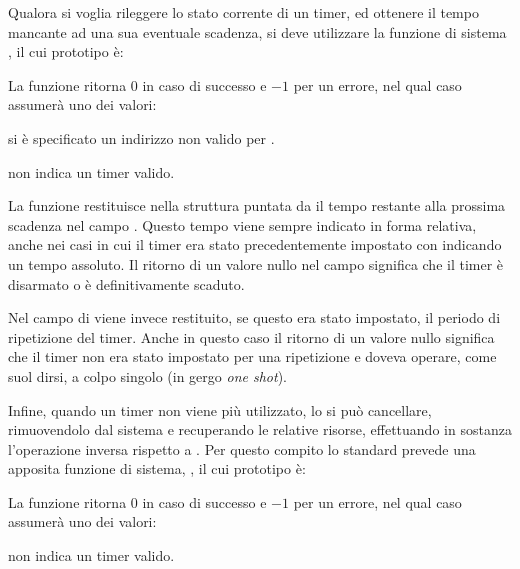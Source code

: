 Qualora si voglia rileggere lo stato corrente di un timer, ed ottenere il
tempo mancante ad una sua eventuale scadenza, si deve utilizzare la funzione
di sistema , il cui prototipo è:

\begin{funcproto}{
}

{La funzione ritorna $0$ in caso di successo e $-1$ per un errore, nel qual
  caso  assumerà uno dei valori: 
  \begin{errlist}
  \item[\errcode{EFAULT}] si è specificato un indirizzo non valido
    per .
  \item[\errcode{EINVAL}]  non indica un timer valido.
  \end{errlist}
}
\end{funcproto}

La funzione restituisce nella struttura  puntata
da  il tempo restante alla prossima scadenza nel campo
. Questo tempo viene sempre indicato in forma relativa, anche
nei casi in cui il timer era stato precedentemente impostato con
 indicando un tempo assoluto.  Il ritorno di un valore
nullo nel campo  significa che il timer è disarmato o è
definitivamente scaduto. 

Nel campo  di  viene invece restituito,
se questo era stato impostato, il periodo di ripetizione del timer.  Anche in
questo caso il ritorno di un valore nullo significa che il timer non era stato
impostato per una ripetizione e doveva operare, come suol dirsi, a colpo
singolo (in gergo \textit{one shot}).

Infine, quando un timer non viene più utilizzato, lo si può cancellare,
rimuovendolo dal sistema e recuperando le relative risorse, effettuando in
sostanza l'operazione inversa rispetto a . Per questo
compito lo standard prevede una apposita funzione di sistema,
, il cui prototipo è:

\begin{funcproto}{
}

{La funzione ritorna $0$ in caso di successo e $-1$ per un errore, nel qual
  caso  assumerà uno dei valori: 
  \begin{errlist}
    \item[\errcode{EINVAL}]  non indica un timer valido.
  \end{errlist}
}
\end{funcproto}

